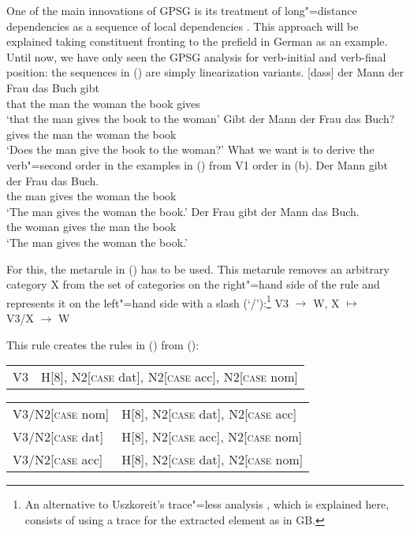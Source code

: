 One of the main innovations of GPSG is its treatment of long"=distance dependencies as a sequence of local dependencies \citep{Gazdar81}.
This approach will be explained taking constituent fronting to the prefield in German as an
example. Until now, we have only seen the GPSG analysis for verb-initial and verb-final position: the
sequences in () are simply linearization variants.
\eal
\ex 
\gll {}[dass] der Mann der Frau das Buch gibt\\
	 {}\spacebr{}that the man the woman the book gives\\
\glt `that the man gives the book to the woman'
\ex 
\gll Gibt der Mann der Frau das Buch?\\
	 gives the man the woman the book\\
\glt `Does the man give the book to the woman?'
\zl
What we want is to derive the verb"=second order in the examples in () from V1 order in (b).
\eal
\ex 
\gll Der Mann gibt der Frau das Buch.\\
     the man  gives the woman the book\\
\glt `The man gives the woman the book.'
\ex 
\gll Der Frau gibt der Mann das Buch.\\
     the woman gives the man the book\\
\glt `The man gives the woman the book.'
\zl

\noindent
For this, the metarule in () has to be used. This metarule removes an arbitrary category X from the set of categories on the right"=hand side of the rule and represents it on
the left"=hand side with a slash (`/')\is{/}:\footnote{%
	An alternative to Uszkoreit's trace"=less analysis \citeyearpar[]{Uszkoreit87a},
        which is explained here, consists of using a trace
	for the extracted element as in GB.
}
\ea
\label{meta-slash-intro}
V3  $\to$ W, X $\mapsto$\\
V3/X  $\to$ W
\z

\noindent
This rule creates the rules in () from ():
\ea
\begin{tabular}[t]{@{}l@{~$\to$~}l@{}}
V3  & H[8], N2[\textsc{case} dat], N2[\textsc{case} acc], N2[\textsc{case} nom] 
\end{tabular}
\z
\ea
\begin{tabular}[t]{@{}l@{~$\to$~}l@{}}
V3/N2[\textsc{case} nom] &  H[8], N2[\textsc{case} dat], N2[\textsc{case} acc]\\
V3/N2[\textsc{case} dat] &  H[8], N2[\textsc{case} acc], N2[\textsc{case} nom]\\
V3/N2[\textsc{case} acc] &  H[8], N2[\textsc{case} dat], N2[\textsc{case} nom]\\
\end{tabular}
\z

